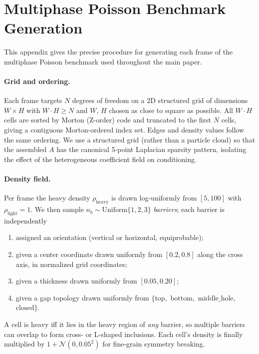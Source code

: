 \documentclass[acmtog,anonymous,review]{acmart}
\begin{document}
\section{Multiphase Poisson Benchmark Generation}
\label{supp:dataset}

This appendix gives the precise procedure for generating each frame of the
multiphase Poisson benchmark used throughout the main paper.

\paragraph{Grid and ordering.}
Each frame targets $N$ degrees of freedom on a 2D structured grid of dimensions
$W\!\times\!H$ with $W\!\cdot\!H\!\ge\!N$ and $W,\,H$ chosen as close to square as
possible. All $W\!\cdot\!H$ cells are sorted by Morton (Z-order) code and
truncated to the first $N$ cells, giving a contiguous Morton-ordered index set.
Edges and density values follow the same ordering. We use a structured grid
(rather than a particle cloud) so that the assembled $A$ has the canonical
5-point Laplacian sparsity pattern, isolating the effect of the heterogeneous
coefficient field on conditioning.

\paragraph{Density field.}
Per frame the heavy density $\rho_{\text{heavy}}$ is drawn log-uniformly from
$[5, 100]$ with $\rho_{\text{light}}\!=\!1$. We then sample $n_b\!\sim\!\mathrm{Uniform}\{1,2,3\}$
\emph{barriers}; each barrier is independently
\begin{enumerate}
\item assigned an orientation (vertical or horizontal, equiprobable);
\item given a center coordinate drawn uniformly from $[0.2, 0.8]$ along the cross
axis, in normalized grid coordinates;
\item given a thickness drawn uniformly from $[0.05, 0.20]$;
\item given a gap topology drawn uniformly from
$\{\text{top},$ $\text{bottom},$ $\text{middle\_hole},$ $\text{closed}\}$.
\end{enumerate}
A cell is heavy iff it lies in the heavy region of \emph{any} barrier, so
multiple barriers can overlap to form cross- or L-shaped inclusions. Each cell's
density is finally multiplied by $1\!+\!\mathcal{N}(0, 0.05^2)$ for fine-grain
symmetry breaking.
\end{document}
